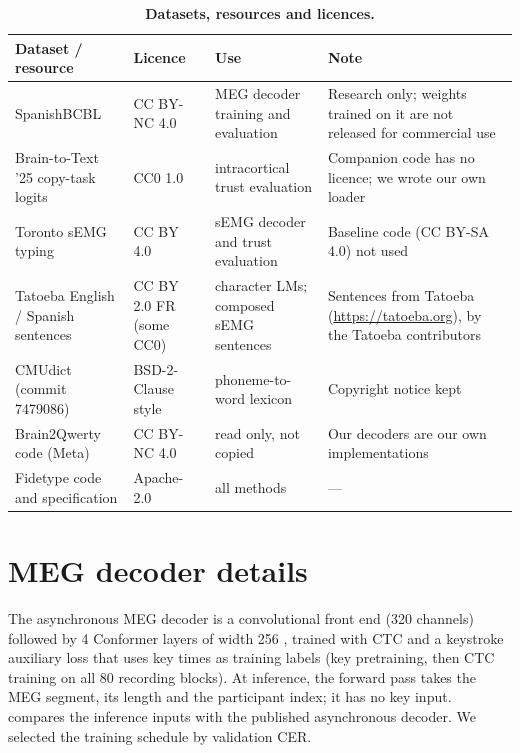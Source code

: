 \begin{table}[H]
  \centering
  \caption{\textbf{Datasets, resources and licences.}}
  \label{tab:licences}
  \small
  \begin{tabular}{@{}p{4.3cm}p{2.4cm}p{3.6cm}p{4.2cm}@{}}
    \toprule
    \textbf{Dataset / resource} & \textbf{Licence} & \textbf{Use} & \textbf{Note} \\
    \midrule
    SpanishBCBL \citep{levy2026brain2qwerty,spanishbcbl} & CC BY-NC 4.0 & MEG decoder training and evaluation & Research only; weights trained on it are not released for commercial use \\
    Brain-to-Text '25 copy-task logits \citep{card2024accurate,card2025data} & CC0 1.0 & intracortical trust evaluation & Companion code has no licence; we wrote our own loader \\
    Toronto sEMG typing \citep{achituve2025emg,achituve2024data} & CC BY 4.0 & sEMG decoder and trust evaluation & Baseline code (CC BY-SA 4.0) not used \\
    Tatoeba English / Spanish sentences & CC BY 2.0 FR (some CC0) & character LMs; composed sEMG sentences & Sentences from Tatoeba (\url{https://tatoeba.org}), by the Tatoeba contributors \\
    CMUdict (commit 7479086) & BSD-2-Clause style & phoneme-to-word lexicon & Copyright notice kept \\
    Brain2Qwerty code (Meta) & CC BY-NC 4.0 & read only, not copied & Our decoders are our own implementations \\
    Fidetype code and specification & Apache-2.0 & all methods & --- \\
    \bottomrule
  \end{tabular}
\end{table}

\FloatBarrier
\section{MEG decoder details}
\label{app:meg}

The asynchronous MEG decoder is a convolutional front end (320 channels) followed by 4 Conformer layers of width 256 \citep{gulati2020conformer}, trained with CTC \citep{graves2006ctc} and a keystroke auxiliary loss that uses key times as training labels (key pretraining, then CTC training on all 80 recording blocks). At inference, the forward pass takes the MEG segment, its length and the participant index; it has no key input.  compares the inference inputs with the published asynchronous decoder. We selected the training schedule by validation CER.

